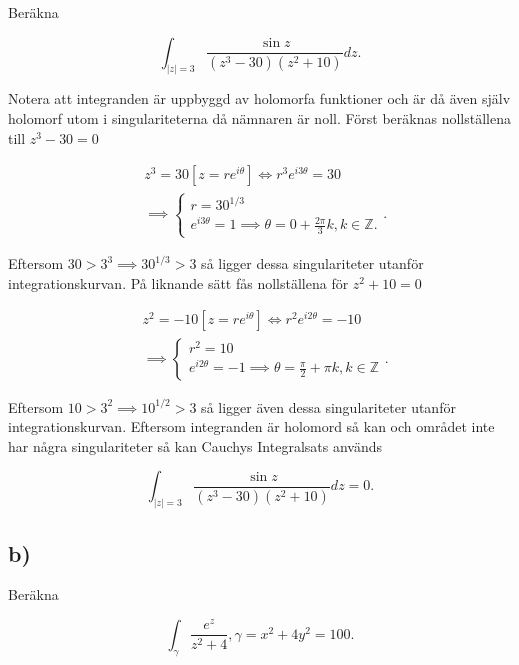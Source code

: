 \documentclass[a4paper]{article}
\begin{document}
Beräkna

\begin{equation*}
	\int_{|z|=3}\frac{\sin z}{(z^3 - 30)(z^2 + 10)}dz.
\end{equation*}

Notera att integranden är uppbyggd av holomorfa funktioner och är då även själv holomorf utom i singulariteterna då nämnaren är noll. Först beräknas nollställena till $z^3 - 30 = 0$

\begin{align*}
	&z^3 = 30 \left[z = re^{i\theta}\right] \iff r^3e^{i3\theta} = 30\\
	&\implies	\begin{cases}
					r = 30^{1/3}\\
					e^{i3\theta} = 1 \implies \theta = 0 + \frac{2\pi}{3}k, k \in \mathbb{Z}.
				\end{cases}.
\end{align*}

Eftersom $30 > 3^3 \implies 30^{1/3} > 3$ så ligger dessa singulariteter utanför integrationskurvan. På liknande sätt fås nollställena för $z^2 + 10 = 0$ 

\begin{align*}
	&z^2 = -10 \left[z = re^{i\theta}\right] \iff r^2e^{i2\theta} = -10\\
	&\implies	\begin{cases}
					r^2 = 10\\
					e^{i2\theta} = -1 \implies \theta = \frac{\pi}{2} + \pi k, k \in \mathbb{Z}
				\end{cases}.
\end{align*}

Eftersom $10 > 3^2 \implies 10^{1/2} > 3$ så ligger även dessa singulariteter utanför integrationskurvan. Eftersom integranden är holomord så kan och området inte har några singulariteter så kan Cauchys Integralsats används

\begin{equation*}
	\int_{|z|=3}\frac{\sin z}{(z^3 - 30)(z^2 + 10)}dz = 0.
\end{equation*}

\subsection*{b)}

Beräkna

\begin{equation*}
	\int_\gamma \frac{e^z}{z^2 + 4}, \gamma = x^2 + 4y^2 = 100.
\end{equation*}
\end{document}
